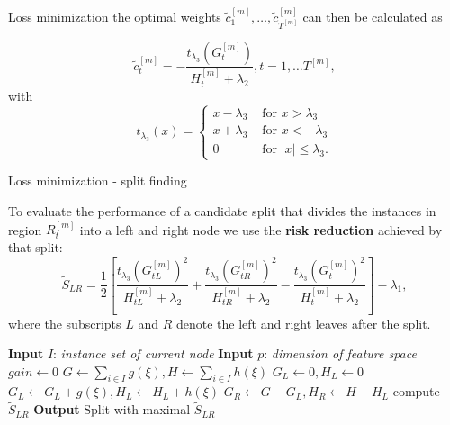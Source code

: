\begin{vbframe}{Loss minimization}
the optimal weights $\tilde{c}^{[m]}_1,\dots, \tilde{c}^{[m]}_{T^{[m]}}$ can then be calculated as

\lz
$$
\tilde{c}^{[m]}_t = - \frac{t_{\lambda_3}\left(G^{[m]}_t\right)}{H^{[m]}_t + \lambda_2}, t=1,\dots T^{[m]},
$$
with $$t_{\lambda_3}(x) = \begin{cases}
  x - \lambda_3 &\text{ for } x > \lambda_3 \\
  x + \lambda_3 &\text{ for } x < - \lambda_3 \\
  0  &\text{ for } |x| \leq \lambda_3.
\end{cases}$$

\end{vbframe}

\begin{vbframe}{Loss minimization - split finding}

To evaluate the performance of a candidate split that divides the instances in region $R_t^{[m]}$ into a left and right node we use the \textbf{risk reduction} achieved by that split:
$$
\tilde S_{LR} =
 \frac12 \left[ 
 \frac{t_{\lambda_3} \left( G^{[m]}_{tL} \right)^2}{H^{[m]}_{tL} + \lambda_2} + \frac{t_{\lambda_3}\left(G^{[m]}_{tR}\right)^2}{H^{[m]}_{tR} + \lambda_2} - \frac{t_{\lambda_3}\left(G^{[m]}_{t}\right)^2}{H^{[m]}_{t} + \lambda_2}
 \right] - \lambda_1,
$$
where the subscripts $L$ and $R$ denote the left and right leaves after the split.


\lz

\framebreak

\begin{algorithm}[H]

\begin{footnotesize}
\begin{center}

  \begin{algorithmic}[1]
    \State \textbf{Input} $I$: \emph{instance set of current node}
    \State \textbf{Input} $p$: \emph{dimension of feature space}
    \State $gain \gets 0$
    \State $G \gets \sum_{i \in I} g(\xi), {H} \gets \sum_{i \in I} h(\xi)$
      \State $G_L \gets 0, {H}_L \gets 0$
        \State ${G}_L \gets {G}_L + g(\xi), {H}_L \gets {H}_L + h(\xi)$
        \State ${G}_R \gets G - {G}_L, {H}_R \gets {H} - {H}_L$
        \State compute $\tilde S_{LR}$
      \EndFor
    \EndFor
    \State \textbf{Output} Split with maximal $\tilde S_{LR}$
  \end{algorithmic}
\end{center}
\end{footnotesize}
\caption{(Exact) Algorithm for split finding}
\end{algorithm}

\end{vbframe}

